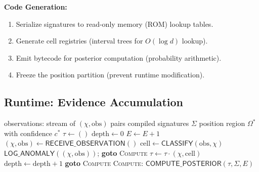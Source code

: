 \documentclass[twocolumn,10pt]{article}
\begin{document}
\textbf{Code Generation:}
\begin{enumerate}[leftmargin=1.5em,topsep=2pt,itemsep=1pt]
  \item Serialize signatures to read-only memory (ROM) lookup tables.
  \item Generate cell registries (interval trees for $O(\log d)$ lookup).
  \item Emit bytecode for posterior computation (probability arithmetic).
  \item Freeze the position partition (prevent runtime modification).
\end{enumerate}

\subsection{Runtime: Evidence Accumulation}

\begin{algorithm}[ht]
\caption{Evidence Accumulation (EXECUTE phase)}
\label{alg:accumulate}
\begin{algorithmic}[1]
\Require observations: stream of $(\chi, \text{obs})$ pairs
\Require compiled signatures $\Sigma$
\Ensure position region $\Omega^*$ with confidence $c^*$
\State $\tau \gets ()$ \quad $\text{depth} \gets 0$ \quad $E \gets E + 1$
\Loop
  \State $(\chi, \text{obs}) \gets \mathsf{RECEIVE\_OBSERVATION}()$
  \State $\text{cell} \gets \mathsf{CLASSIFY}(\text{obs}, \chi)$
    \State $\mathsf{LOG\_ANOMALY}((\chi, \text{obs}))$; \textbf{goto} \textsc{Compute}
  \EndIf
  \State $\tau \gets \tau \cdot (\chi, \text{cell})$
  \State $\text{depth} \gets \text{depth} + 1$
    \textbf{goto} \textsc{Compute}
  \EndIf
\EndLoop
\State \textsc{Compute}:
\State \Return $\mathsf{COMPUTE\_POSTERIOR}(\tau, \Sigma, E)$
\end{algorithmic}
\end{algorithm}
\end{document}
